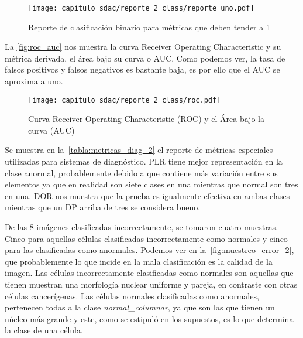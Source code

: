 \begin{figure}[H]
    \centering
    \texttt{[image: capitulo\_sdac/reporte\_2\_class/reporte\_uno.pdf]}
    \caption{Reporte de clasificación binario para métricas que deben tender a 1}\label{fig:reporte_2_1}
\end{figure}

La \autoref{fig:roc_auc} nos muestra la curva Receiver Operating Characteristic
y su métrica derivada, el área bajo su curva o AUC. Como podemos ver, la tasa de
falsos positivos y falsos negativos es bastante baja, es por ello que el AUC se
aproxima a uno.

\begin{figure}[H]
    \centering
    \texttt{[image: capitulo\_sdac/reporte\_2\_class/roc.pdf]}
    \caption{Curva Receiver Operating Characteristic (ROC) y el Área bajo la curva (AUC)}\label{fig:roc_auc}
\end{figure}

Se muestra en la~\autoref{tabla:metricas_diag_2} el reporte de métricas
especiales utilizadas para sistemas de diagnóstico. PLR tiene mejor
representación en la clase anormal, probablemente debido a que contiene más
variación entre sus elementos ya que en realidad son siete clases en una
mientras que normal son tres en una. DOR nos muestra que la prueba es igualmente
efectiva en ambas clases mientras que un DP arriba de tres se considera bueno.

\begin{table}[H]
    \centering
    \caption{Métricas para diagnóstico binario}
    \label{tabla:metricas_diag_2}
    \end{table}

De las 8 imágenes clasificadas incorrectamente, se tomaron cuatro muestras.
Cinco para aquellas células clasificadas incorrectamente como normales y cinco
para las clasificadas como anormales. Podemos ver en
la~\autoref{fig:muestreo_error_2}, que probablemente lo que incide en la mala
clasificación es la calidad de la imagen. Las células incorrectamente
clasificadas como normales son aquellas que tienen muestran una morfología
nuclear uniforme y pareja, en contraste con otras células cancerígenas. Las
células normales clasificadas como anormales, pertenecen todas a la clase
\emph{normal\_columnar}, ya que son las que tienen un núcleo más grande y este,
como se estipuló en los supuestos, es lo que determina la clase de una célula.

